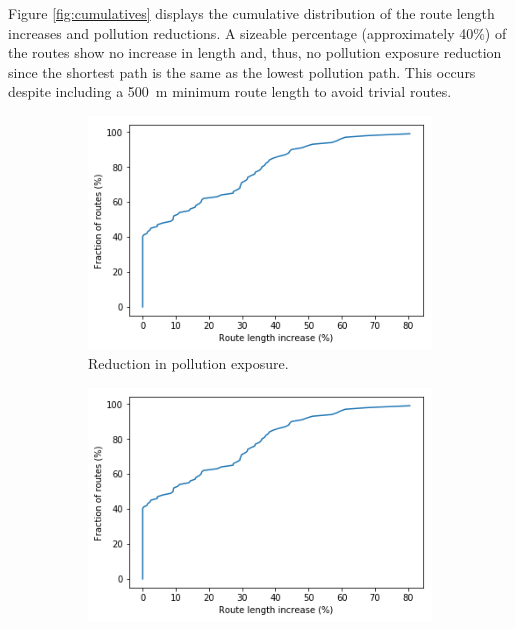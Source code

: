\documentclass[11pt]{report}
\begin{document}
Figure \ref{fig:cumulatives} displays the cumulative distribution of the route length increases and pollution reductions. A sizeable percentage (approximately 40\%) of the routes show no increase in length and, thus, no pollution exposure reduction since the shortest path is the same as the lowest pollution path. This occurs despite including a 500~m minimum route length to avoid trivial routes.

\begin{figure}[!tb]
    \centering
    \begin{minipage}{1\linewidth}
            \begin{subfigure}[t]{.5\linewidth}
                \includegraphics[width=\textwidth]{images/pollution_reductions}
                \caption{Reduction in pollution exposure.}
                \label{fig:pollution_reductions}
            \end{subfigure}
            \begin{subfigure}[t]{.5\linewidth}
            	\includegraphics[width=\textwidth]{images/length_increases}

\end{subfigure}
\end{minipage}
\end{figure}
\end{document}
